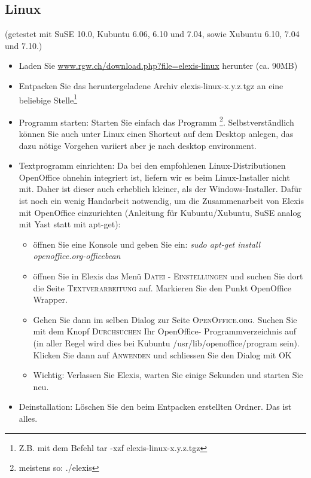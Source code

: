 \subsection{Linux}
(getestet mit SuSE 10.0, Kubuntu 6.06, 6.10 und 7.04, sowie  Xubuntu 6.10, 7.04 und
7.10.)
\begin{itemize}
	\item Laden Sie \href{http://www.rgw.ch/download.php?file=elexis-linux}{www.rgw.ch/download.php?file=elexis-linux} herunter (ca. 90MB)
	\item Entpacken Sie das	heruntergeladene Archiv	elexis-linux-x.y.z.tgz an eine beliebige Stelle\footnote{Z.B. mit dem Befehl tar -xzf elexis-linux-x.y.z.tgz}
    \item Programm starten: Starten Sie einfach das Programm \footnote{meistens so: ./elexis}. Selbstverständlich können Sie auch unter Linux einen Shortcut auf dem Desktop
    anlegen, das dazu nötige Vorgehen variiert aber je nach desktop environment.

 	\item Textprogramm einrichten: Da bei den empfohlenen Linux-Distributionen
 	Open\-Of\-fi\-ce ohnehin integriert ist, liefern wir es beim Linux-Installer nicht
 	mit. Daher ist dieser auch erheblich kleiner, als der Windows-Installer. Dafür
 	ist noch ein wenig 	\glqq Handarbeit\grqq{} notwendig, um die Zusammenarbeit
 	von Elexis mit OpenOffice einzurichten (Anleitung für Kubuntu/Xubuntu, SuSE
 	analog mit Yast statt mit apt-get):
	\begin{itemize}
	 	\item öffnen Sie eine Konsole und geben Sie ein: \textit{sudo apt-get in\-stall
	 	openoffice.org-office\-bean}
		\item öffnen Sie in Elexis das Menü \textsc{Datei - Einstellungen} und suchen
		Sie dort die Seite \textsc{Textverarbeitung} auf. Markieren Sie den Punkt
		\glqq Open\-Of\-fice Wrap\-per\grqq{}.
		\item Gehen Sie dann im selben Dialog zur Seite \textsc{OpenOffice.org}.
		Suchen Sie mit dem Knopf \textsc{Durchsuchen} Ihr OpenOffice-
		Programmverzeichnis auf (in aller Regel wird dies bei Kubuntu
		/usr/lib/openoffice/program sein). Klicken Sie dann auf \textsc{Anwenden} und
		schliessen Sie den Dialog mit \textsc{OK}
		\item Wichtig: Verlassen Sie Elexis, warten Sie einige Sekunden und starten
		Sie neu.
    \end{itemize}
  \item Deinstallation: Löschen Sie den beim Entpacken erstellten Ordner. Das
 ist alles.
\end{itemize}

